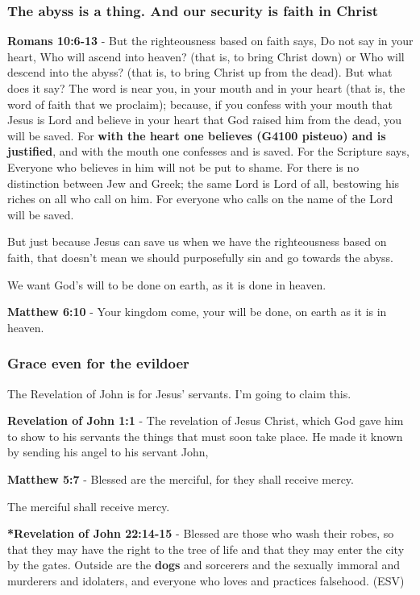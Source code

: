 \documentclass[11pt]{article}
\begin{document}
\subsubsection{The abyss is a thing. And our security is faith in Christ}
\label{sec:orgbfedb4d}
\textbf{Romans 10:6-13} - But the righteousness based on faith says, Do not say in your heart, Who will ascend into heaven? (that is, to bring Christ down) or Who will descend into the abyss? (that is, to bring Christ up from the dead).  But what does it say? The word is near you, in your mouth and in your heart (that is, the word of faith that we proclaim); because, if you confess with your mouth that Jesus is Lord and believe in your heart that God raised him from the dead, you will be saved.  For \textbf{with the heart one believes (G4100 pisteuo) and is justified}, and with the mouth one confesses and is saved.  For the Scripture says, Everyone who believes in him will not be put to shame.  For there is no distinction between Jew and Greek; the same Lord is Lord of all, bestowing his riches on all who call on him.  For everyone who calls on the name of the Lord will be saved.

But just because Jesus can save us when we have the righteousness based on faith, that doesn't mean we should purposefully sin and go towards the abyss.

We want God's will to be done on earth, as it is done in heaven.

\textbf{Matthew 6:10} - Your kingdom come, your will be done, on earth as it is in heaven.

\subsubsection{Grace even for the evildoer}
\label{sec:orgc7440bd}
The Revelation of John is for Jesus' servants. I'm going to claim this.

\textbf{Revelation of John 1:1} - The revelation of Jesus Christ, which God gave him to show to his servants the things that must soon take place. He made it known by sending his angel to his servant John,

\textbf{Matthew 5:7} - Blessed are the merciful, for they shall receive mercy.

The merciful shall receive mercy.

\textbf{*Revelation of John 22:14-15} - Blessed are those who wash their robes, so that they may have the right to the tree of life and that they may enter the city by the gates. Outside are the \textbf{dogs} and sorcerers and the sexually immoral and murderers and idolaters, and everyone who loves and practices falsehood. (ESV)
\end{document}
